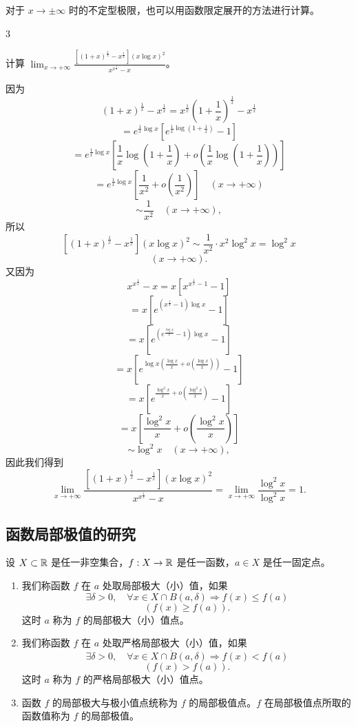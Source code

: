 对于 $x\to\pm\infty$ 时的不定型极限，也可以用函数限定展开的方法进行计算。

\begin{sourceexample}{3}

计算 $\displaystyle\lim_{x\to+\infty}\frac{\left[(1+x)^{\frac{1}{x}}-x^{\frac{1}{x}}\right](x\log x)^{2}}{x^{x^{\frac{1}{x}}}-x}$。

因为
\[(1+x)^{\frac{1}{x}}-x^{\frac{1}{x}}=x^{\frac{1}{x}}\left(1+\frac{1}{x}\right)^{\frac{1}{x}}-x^{\frac{1}{x}}\]
\[=e^{\frac{1}{x}\log x}\left[e^{\frac{1}{x}\log\left(1+\frac{1}{x}\right)}-1\right]\]
\[=e^{\frac{1}{x}\log x}\left[\frac{1}{x}\log\left(1+\frac{1}{x}\right)+o\left(\frac{1}{x}\log\left(1+\frac{1}{x}\right)\right)\right]\]
\[=e^{\frac{1}{x}\log x}\left[\frac{1}{x^2}+o\left(\frac{1}{x^2}\right)\right]\quad(x\to+\infty)\]
\[\sim\frac{1}{x^2}\quad(x\to+\infty),\]
所以
\[[(1+x)^{\frac{1}{x}}-x^{\frac{1}{x}}](x\log x)^{2}\sim\frac{1}{x^{2}}\cdot x^{2}\log^{2}x=\log^{2}x\]
\[(x\to+\infty).\]
又因为
\[x^{x^{\frac{1}{x}}}-x=x\left[x^{x^{\frac{1}{x}}-1}-1\right]\]
\[=x\left[e^{\left(x^{\frac{1}{x}}-1\right)\log x}-1\right]\]
\[=x\left[e^{\left(e^{\frac{\log x}{x}}-1\right)\log x}-1\right]\]
\[=x\left[e^{\log x\left(\frac{\log x}{x}+o\left(\frac{\log x}{x}\right)\right)}-1\right]\]
\[=x\left[e^{\frac{\log^{2}x}{x}+o\left(\frac{\log^{2}x}{x}\right)}-1\right]\]
\[=x\left[\frac{\log^{2}x}{x}+o\left(\frac{\log^{2}x}{x}\right)\right]\]
\[\sim\log^{2}x\quad(x\to+\infty),\]
因此我们得到
\[\lim_{x\to+\infty}\frac{\left[(1+x)^{\frac{1}{x}}-x^{\frac{1}{x}}\right](x\log x)^{2}}{x^{x^{\frac{1}{x}}}-x}=\lim_{x\to+\infty}\frac{\log^{2}x}{\log^{2}x}=1.\]

\end{sourceexample}

\subsection{函数局部极值的研究}
	\label{sec:8-5-2}

\begin{mydef*}{}

设 $X\subset\mathbb{R}$ 是任一非空集合，$f:X\to\mathbb{R}$ 是任一函数，$a\in X$ 是任一固定点。

\begin{enumerate}[label=\arabic{enumi})]
\item 我们称函数 $f$ 在 $a$ 处取局部极大（小）值，如果
\[\exists\delta>0,\quad\forall x\in X\cap B(a,\delta)\Longrightarrow f(x)\leqslant f(a)\]
\[(f(x)\geqslant f(a)).\]
这时 $a$ 称为 $f$ 的局部极大（小）值点。
\item 我们称函数 $f$ 在 $a$ 处取严格局部极大（小）值，如果
\[\exists\delta>0,\quad\forall x\in X\cap\mathring{B}(a,\delta)\Longrightarrow f(x)<f(a)\]
\[(f(x)>f(a)).\]
这时 $a$ 称为 $f$ 的严格局部极大（小）值点。
\item 函数 $f$ 的局部极大与极小值点统称为 $f$ 的局部极值点。$f$ 在局部极值点所取的函数值称为 $f$ 的局部极值。
\end{enumerate}

\end{mydef*}

